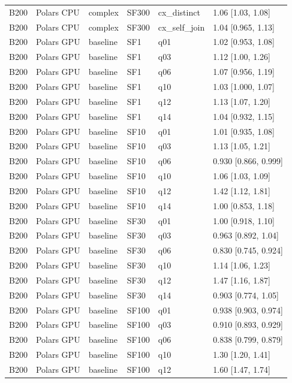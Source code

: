 \begin{longtable}{llllll}
B200 & Polars CPU & complex & SF300 & cx\_distinct & 1.06 [1.03, 1.08] \\
B200 & Polars CPU & complex & SF300 & cx\_self\_join & 1.04 [0.965, 1.13] \\
B200 & Polars GPU & baseline & SF1 & q01 & 1.02 [0.953, 1.08] \\
B200 & Polars GPU & baseline & SF1 & q03 & 1.12 [1.00, 1.26] \\
B200 & Polars GPU & baseline & SF1 & q06 & 1.07 [0.956, 1.19] \\
B200 & Polars GPU & baseline & SF1 & q10 & 1.03 [1.000, 1.07] \\
B200 & Polars GPU & baseline & SF1 & q12 & 1.13 [1.07, 1.20] \\
B200 & Polars GPU & baseline & SF1 & q14 & 1.04 [0.932, 1.15] \\
B200 & Polars GPU & baseline & SF10 & q01 & 1.01 [0.935, 1.08] \\
B200 & Polars GPU & baseline & SF10 & q03 & 1.13 [1.05, 1.21] \\
B200 & Polars GPU & baseline & SF10 & q06 & 0.930 [0.866, 0.999] \\
B200 & Polars GPU & baseline & SF10 & q10 & 1.06 [1.03, 1.09] \\
B200 & Polars GPU & baseline & SF10 & q12 & 1.42 [1.12, 1.81] \\
B200 & Polars GPU & baseline & SF10 & q14 & 1.00 [0.853, 1.18] \\
B200 & Polars GPU & baseline & SF30 & q01 & 1.00 [0.918, 1.10] \\
B200 & Polars GPU & baseline & SF30 & q03 & 0.963 [0.892, 1.04] \\
B200 & Polars GPU & baseline & SF30 & q06 & 0.830 [0.745, 0.924] \\
B200 & Polars GPU & baseline & SF30 & q10 & 1.14 [1.06, 1.23] \\
B200 & Polars GPU & baseline & SF30 & q12 & 1.47 [1.16, 1.87] \\
B200 & Polars GPU & baseline & SF30 & q14 & 0.903 [0.774, 1.05] \\
B200 & Polars GPU & baseline & SF100 & q01 & 0.938 [0.903, 0.974] \\
B200 & Polars GPU & baseline & SF100 & q03 & 0.910 [0.893, 0.929] \\
B200 & Polars GPU & baseline & SF100 & q06 & 0.838 [0.799, 0.879] \\
B200 & Polars GPU & baseline & SF100 & q10 & 1.30 [1.20, 1.41] \\
B200 & Polars GPU & baseline & SF100 & q12 & 1.60 [1.47, 1.74] \\

\end{longtable}
